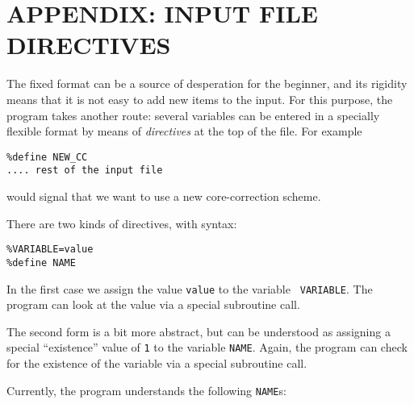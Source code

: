 \documentclass[11pt]{article}
\begin{document}
\section{APPENDIX: INPUT FILE DIRECTIVES}
\label{sec:directives}

The fixed format can be a source of desperation for the beginner, and
its rigidity means that it is not easy to add new items to the
input. For this purpose, the program takes another route: several
variables can be entered in a specially flexible format by means of
{\sl directives} at the top of the file. For example

\begin{verbatim}
%define NEW_CC
.... rest of the input file
\end{verbatim}

would signal that we want to use a new core-correction scheme.

There are two kinds of directives, with syntax:
\begin{verbatim}
%VARIABLE=value
%define NAME
\end{verbatim}

In the first case we assign the value {\tt value} to the variable {\tt
 VARIABLE}. The program can look at the value via a special
 subroutine call.

The second form is a bit more abstract, but can be understood as
assigning a special ``existence'' value of {\tt 1} to the variable
{\tt NAME}.  Again, the program can check for the existence of the
variable via a special subroutine call.

Currently, the program understands the following {\tt NAME}s:
\end{document}
